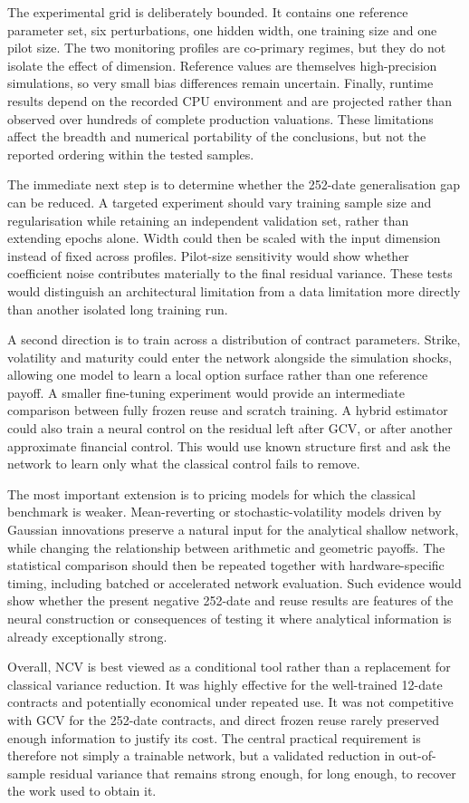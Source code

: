 The experimental grid is deliberately bounded. It contains one reference parameter set, six perturbations, one hidden width, one training size and one pilot size. The two monitoring profiles are co-primary regimes, but they do not isolate the effect of dimension. Reference values are themselves high-precision simulations, so very small bias differences remain uncertain. Finally, runtime results depend on the recorded CPU environment and are projected rather than observed over hundreds of complete production valuations. These limitations affect the breadth and numerical portability of the conclusions, but not the reported ordering within the tested samples.

The immediate next step is to determine whether the 252-date generalisation gap can be reduced. A targeted experiment should vary training sample size and regularisation while retaining an independent validation set, rather than extending epochs alone. Width could then be scaled with the input dimension instead of fixed across profiles. Pilot-size sensitivity would show whether coefficient noise contributes materially to the final residual variance. These tests would distinguish an architectural limitation from a data limitation more directly than another isolated long training run.

A second direction is to train across a distribution of contract parameters. Strike, volatility and maturity could enter the network alongside the simulation shocks, allowing one model to learn a local option surface rather than one reference payoff. A smaller fine-tuning experiment would provide an intermediate comparison between fully frozen reuse and scratch training. A hybrid estimator could also train a neural control on the residual left after GCV, or after another approximate financial control. This would use known structure first and ask the network to learn only what the classical control fails to remove.

The most important extension is to pricing models for which the classical benchmark is weaker. Mean-reverting or stochastic-volatility models driven by Gaussian innovations preserve a natural input for the analytical shallow network, while changing the relationship between arithmetic and geometric payoffs. The statistical comparison should then be repeated together with hardware-specific timing, including batched or accelerated network evaluation. Such evidence would show whether the present negative 252-date and reuse results are features of the neural construction or consequences of testing it where analytical information is already exceptionally strong.

Overall, NCV is best viewed as a conditional tool rather than a replacement for classical variance reduction. It was highly effective for the well-trained 12-date contracts and potentially economical under repeated use. It was not competitive with GCV for the 252-date contracts, and direct frozen reuse rarely preserved enough information to justify its cost. The central practical requirement is therefore not simply a trainable network, but a validated reduction in out-of-sample residual variance that remains strong enough, for long enough, to recover the work used to obtain it.
